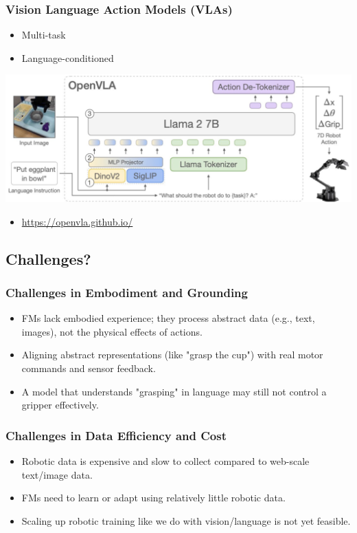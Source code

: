 \documentclass[10pt]{article}
\begin{document}
\subsubsection*{Vision Language Action Models (VLAs)}
\begin{itemize}
	\item Multi-task
	\item Language-conditioned
\end{itemize}
\begin{center} 
	\includegraphics*[width=\textwidth]{L1_6.png} 
\end{center}
\begin{itemize}
    \item \url{https://openvla.github.io/}
\end{itemize}

\subsection*{Challenges?}
\subsubsection*{Challenges in Embodiment and Grounding}
\begin{itemize}
	\item FMs lack embodied experience; they process abstract data (e.g., text, images), not the physical effects of actions.
	\item Aligning abstract representations (like "grasp the cup") with real motor commands and sensor feedback.
	\item A model that understands "grasping" in language may still not control a gripper effectively.
\end{itemize}

\subsubsection*{Challenges in Data Efficiency and Cost}
\begin{itemize}
	\item Robotic data is expensive and slow to collect compared to web-scale text/image data.
	\item FMs need to learn or adapt using relatively little robotic data.
	\item Scaling up robotic training like we do with vision/language is not yet feasible.
\end{itemize}
\end{document}

